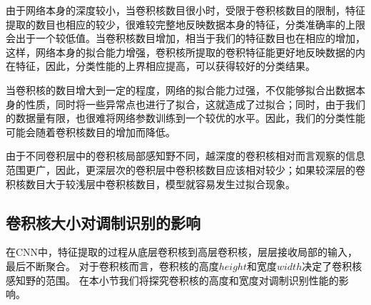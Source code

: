 由于网络本身的深度较小，当卷积核数目很小时，受限于卷积核数目的限制，特征提取的数目也相应的较少，很难较完整地反映数据本身的特征，分类准确率的上限会出于一个较低值。当卷积核数目增加，相当于我们的特征数目也在相应的增加，这样，网络本身的拟合能力增强，卷积核所提取的卷积特征能更好地反映数据的内在特征，因此，分类性能的上界相应提高，可以获得较好的分类结果。\par
当卷积核的数目增大到一定的程度，网络的拟合能力过强，不仅能够拟合出数据本身的性质，同时将一些异常点也进行了拟合，这就造成了过拟合；同时，由于我们的数据量有限，也很难将网络参数训练到一个较优的水平。因此，我们的分类性能可能会随着卷积核数目的增加而降低。\par

由于不同卷积层中的卷积核局部感知野不同，越深度的卷积核相对而言观察的信息范围更广，因此，更深层次的卷积层中卷积核数目应该相对较少；如果较深层的卷积核数目大于较浅层中卷积核数目，模型就容易发生过拟合现象。

\subsection{卷积核大小对调制识别的影响}
在CNN中，特征提取的过程从底层卷积核到高层卷积核，层层接收局部的输入，最后不断聚合。
对于卷积核而言，卷积核的高度$height$和宽度$width$决定了卷积核感知野的范围。
在本小节我们将探究卷积核的高度和宽度对调制识别性能的影响。\par

